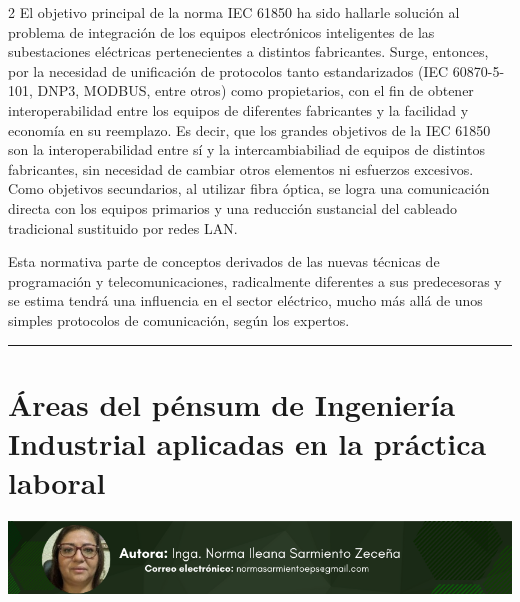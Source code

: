 \documentclass[12pt,spanish,Letterpaper,openany]{book}
\newcommand{\HRule}{\begin{center}\rule{0.5\linewidth}{0.2mm}\end{center}}
\begin{document}
\begin {multicols}{2}
El objetivo principal de la norma IEC 61850 ha sido hallarle solución al problema de integración de los equipos electrónicos inteligentes de las subestaciones eléctricas pertenecientes a distintos fabricantes. Surge, entonces, por la necesidad de unificación de protocolos tanto estandarizados (IEC 60870-5-101, DNP3, MODBUS, entre otros) como propietarios, con el fin de obtener interoperabilidad entre los equipos de diferentes fabricantes y la facilidad y economía en su reemplazo. Es decir, que los grandes objetivos de la IEC 61850 son la interoperabilidad entre sí y la intercambiabiliad de equipos de distintos fabricantes, sin necesidad de cambiar otros elementos ni esfuerzos excesivos. Como objetivos secundarios, al utilizar fibra óptica, se logra una comunicación directa con los equipos primarios y una reducción sustancial del cableado tradicional sustituido por redes LAN.

Esta normativa parte de conceptos derivados de las nuevas técnicas de programación y telecomunicaciones, radicalmente diferentes a sus predecesoras y se estima tendrá una influencia en el sector eléctrico, mucho más allá de unos simples protocolos de comunicación, según los expertos.

\end {multicols}

\medskip

\HRule

\medskip

\hypertarget{article02}{%
\chapter{Áreas del pénsum de Ingeniería Industrial aplicadas en la práctica laboral}\label{article02}}

\begin{center}\includegraphics[width=1\linewidth]{images/norma} \end{center}
\end{document}
